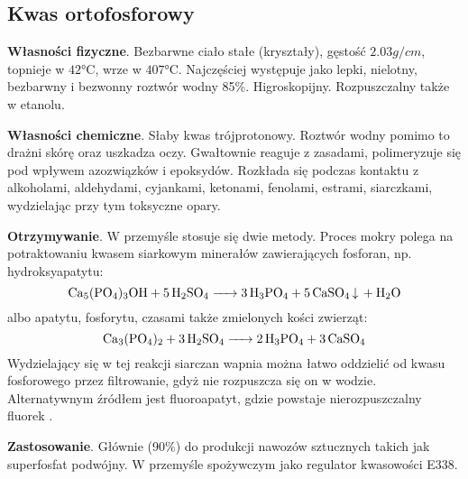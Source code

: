 \subsection{Kwas ortofosforowy }
\textbf{Własności fizyczne}.
Bezbarwne ciało stałe (kryształy), gęstość $2.03 \si{g \per cm}$, topnieje w $42\si{\celsius}$, wrze w $407\si{\celsius}$.
Najczęściej występuje jako lepki, nielotny, bezbarwny i bezwonny roztwór wodny 85\%.
Higroskopijny.
Rozpuszczalny także w etanolu.

\textbf{Własności chemiczne}.
Słaby kwas trójprotonowy.
Roztwór wodny pomimo to drażni skórę oraz uszkadza oczy.
Gwałtownie reaguje z zasadami, polimeryzuje się pod wpływem azozwiązków i epoksydów.
Rozkłada się podczas kontaktu z alkoholami, aldehydami, cyjankami, ketonami, fenolami, estrami, siarczkami, wydzielając przy tym toksyczne opary.

\textbf{Otrzymywanie}.
W przemyśle stosuje się dwie metody.
Proces mokry polega na potraktowaniu kwasem siarkowym minerałów zawierających fosforan, np. hydroksyapatytu: $$\ce{Ca5(PO4)3OH + 5 H2SO4 -> 3 H3PO4 + 5 CaSO4 v + H2O}$$ albo apatytu, fosforytu, czasami także zmielonych kości zwierząt:
$$\ce{Ca3(PO4)2 + 3 H2SO4 -> 2 H3PO4 + 3 CaSO4}$$
Wydzielający się w tej reakcji siarczan wapnia można łatwo oddzielić od kwasu fosforowego przez filtrowanie, gdyż nie rozpuszcza się on w wodzie.
Alternatywnym źródłem jest fluoroapatyt, gdzie powstaje nierozpuszczalny fluorek .

\textbf{Zastosowanie}. Głównie (90\%) do produkcji nawozów sztucznych takich jak superfosfat podwójny. W przemyśle spożywczym jako regulator kwasowości E338.
